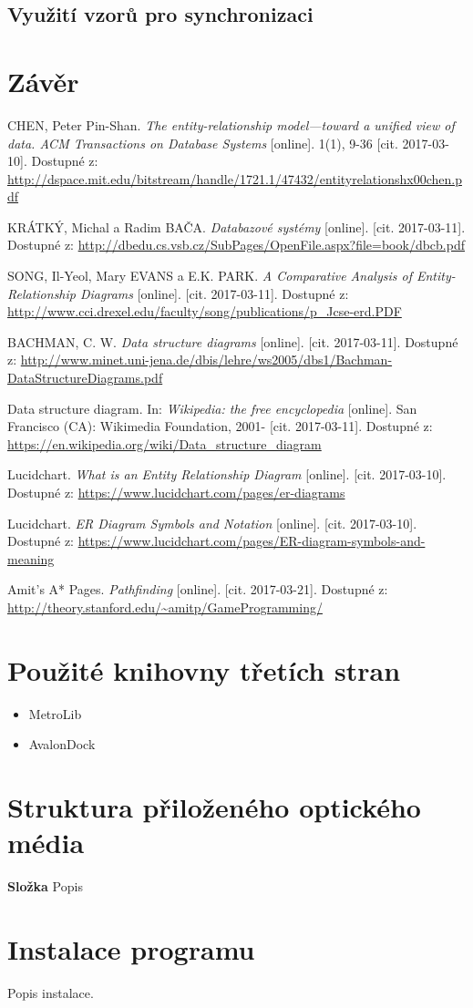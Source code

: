 \documentclass[czech,bachelor,public,dept460,male,oneside]{diploma}
\begin{document}
		
	
	\subsection{Využití vzorů pro synchronizaci}

\newpage
\section{Závěr}

\newpage
\begin{thebibliography}{99}
	 CHEN, Peter Pin-Shan. \textit{The entity-relationship model---toward a unified view of data. ACM Transactions on Database Systems} [online]. 1(1), 9-36 [cit. 2017-03-10]. Dostupné z: \url{http://dspace.mit.edu/bitstream/handle/1721.1/47432/entityrelationshx00chen.pdf}
	
	 KRÁTKÝ, Michal a Radim BAČA. \textit{Databazové systémy} [online]. [cit. 2017-03-11]. Dostupné z: \url{http://dbedu.cs.vsb.cz/SubPages/OpenFile.aspx?file=book/dbcb.pdf}
	
	 SONG, Il-Yeol, Mary EVANS a E.K. PARK. \textit{A Comparative Analysis of Entity-Relationship Diagrams} [online]. [cit. 2017-03-11]. Dostupné z: \url{http://www.cci.drexel.edu/faculty/song/publications/p_Jcse-erd.PDF}
	
	 BACHMAN, C. W. \textit{Data structure diagrams} [online]. [cit. 2017-03-11]. Dostupné z: \url{http://www.minet.uni-jena.de/dbis/lehre/ws2005/dbs1/Bachman-DataStructureDiagrams.pdf}
	
	 Data structure diagram. In: \textit{Wikipedia: the free encyclopedia} [online]. San Francisco (CA): Wikimedia Foundation, 2001- [cit. 2017-03-11]. Dostupné z: \url{https://en.wikipedia.org/wiki/Data_structure_diagram}
	
	Lucidchart. \textit{What is an Entity Relationship Diagram} [online]. [cit. 2017-03-10]. Dostupné z: \url{https://www.lucidchart.com/pages/er-diagrams}
	
	Lucidchart. \textit{ER Diagram Symbols and Notation} [online]. [cit. 2017-03-10]. Dostupné z: \url{https://www.lucidchart.com/pages/ER-diagram-symbols-and-meaning}
	
	Amit’s A* Pages. \textit{Pathfinding} [online]. [cit. 2017-03-21]. Dostupné z: \url{http://theory.stanford.edu/~amitp/GameProgramming/}
\end{thebibliography}


\appendix
\section{Použité knihovny třetích stran}
\begin{itemize}
	\item MetroLib
	\item AvalonDock
\end{itemize}

\section{Struktura přiloženého optického média}
\textbf{Složka} Popis

\section{Instalace programu}
Popis instalace.
\end{document}
